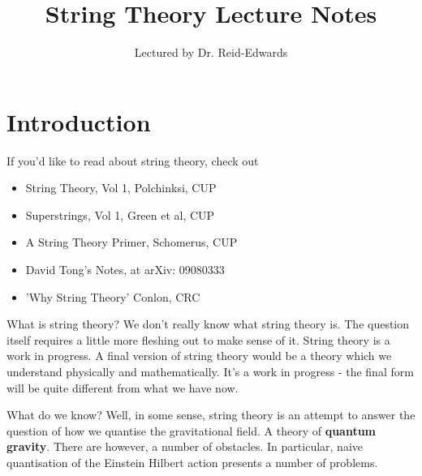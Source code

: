 \documentclass[11pt, oneside]{article}   	%
\title{String Theory Lecture Notes}
\author{Lectured by Dr. Reid-Edwards}
\theoremstyle{slanted}
\begin{document}
 
\maketitle
\tableofcontents

\pagebreak 

\section{Introduction}%
\label{sec:introduction}

If you'd like to read about string theory, 
check out 
\begin{itemize}
	\item String Theory, Vol 1, Polchinksi, CUP 
	\item Superstrings, Vol 1, Green et al, CUP
	\item A String Theory Primer, Schomerus, CUP
	\item David Tong's Notes, at arXiv: 09080333
	\item 'Why String Theory' Conlon, CRC  
\end{itemize}

What is string theory? 
We don't really know what string theory is. 
The question itself requires a little more 
fleshing out to make sense of it. String theory 
is a work in progress. A final version of string 
theory would be a theory which we understand physically 
and mathematically. 
It's a work in progress - the final form will 
be quite different from what we have now. 

What do we know? 
Well, in some sense, string theory 
is an attempt to answer the question of how we quantise the 
gravitational field. A theory of \textbf{quantum gravity}. 
There are however, a number of obstacles.
In particular, naive quantisation of the 
Einstein Hilbert action presents a number of problems. 
\end{document}
